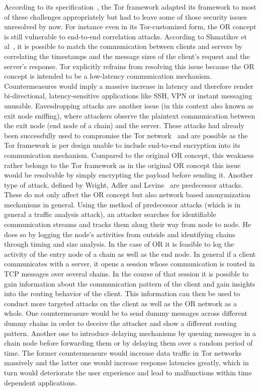 \documentclass{sig-alternate}
\begin{document}
According to its specification~\cite{torspec}, the Tor framework adapted its framework to most of these challenges appropriately but had to leave some of those security issues unresolved by now. For instance even in its Tor-customized form, the OR concept is still vulnerable to end-to-end correlation attacks. According to Shmatikov et al~\cite{shmatikov2006timing}, it is possible to match the communication between clients and servers by correlating the timestamps and the message sizes of the client's request and the server's response. Tor explicitly refrains from resolving this issue because the OR concept is intended to be a low-latency communication mechanism. Countermeasures would imply a massive increase in latency and therefore render bi-directional, latency-sensitive applications like SSH, VPN or instant messaging unusable.
Eavesdropping attacks are another issue (in this context also known as exit node sniffing), where attackers observe the plaintext communication between the exit node (end node of a chain) and the server. These attacks had already been successfully used to compromise the Tor network~\cite{eavesdrop} and are possible as the Tor framework is per design unable to include end-to-end encryption into its communication mechanism. Compared to the original OR concept, this weakness rather belongs to the Tor framework as in the original OR concept this issue would be resolvable by simply encrypting the payload before sending it.
Another type of attack, defined by Wright, Adler and Levine~\cite{wright2004predecessor} are predecessor attacks. These do not only affect the OR concept but also network based anonymization mechanisms in general. Using the method of predecessor attacks (which is in general a traffic analysis attack), an attacker searches for identifiable communication streams and tracks them along their way from node to node. He does so by logging the node's activities from outside and identifying chains through timing and size analysis. In the case of OR it is feasible to log the activity of the entry node of a chain as well as the end node. In general if a client communicates with a server, it opens a session whose communication is routed in TCP messages over several chains. In the course of that session it is possible to gain information about the communication pattern of the client and gain insights into the routing behavior of the client. This information can then be used to conduct more targeted attacks on the client as well as the OR network as a whole. One countermeasure would be to send dummy messages across different dummy chains in order to deceive the attacker and show a different routing pattern. Another one to introduce delaying mechanisms by queuing messages in a chain node before forwarding them or by delaying them over a random period of time. The former countermeasure would increase data traffic in Tor networks massively and the latter one would increase response latencies greatly, which in turn would deteriorate the user experience and lead to malfunctions within time dependent applications. 
\end{document}
